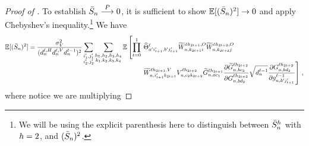 \begin{proof}[Proof of ]
    To establish $\bar{S}_{n} \overset{P}{\longrightarrow} 0$, it is sufficient to show $\operatorname*{\mathbb{E}} [ (\bar{S}_{n})^2 ] \to 0$ and apply Chebyshev's inequality.\footnote{We will be using the explicit parenthesis here to distinguish between $\bar{S}_{n}^h$ with $h = 2$, and $(\bar{S}_n)^2$.}
    We have
    \begin{align*}
        \operatorname*{\mathbb{E}} [(\bar{S}_{n})^2]
        =
        \frac{\sigma_{V}^2}{(d_{n}^{\ell, H} d_{n}^{\ell, V}d_{n}^{\ell - 1})^2}
        \sum_{\substack{i'_1, j'_1 \\ i'_2, j'_2}}
        \sum_{\substack{h_1, h_2, h_3, h_4 \\ k_1, k_2, k_3, k_4}}
            \begin{aligned}[t]
            \operatorname*{\mathbb{E}} \left[
                \prod_{t=0}^1
                \right.&\left.
                \widehat{\Theta}_{
                    a' i'_{t+1} , b' j'_{t+1}
                }^{\ell}
                \widetilde{W}_{n , k_{2t + 1} i}^{\ell h_{2t + 1} , O}
                \widetilde{W}_{n , k_{2t + 2} j}^{\ell h_{2t + 2} , O}
                \right.
                \\
                &\left.
                \widetilde{W}_{n, i'_{t+1} k_{2t + 1}}^{\ell h_{2t + 1}, V}
                V_{n, c_2 k_{2t + 2}}^{\ell h_{2t + 2}}
                \widetilde{G}_{n, a c_1}^{\ell h_{2t + 1}}
                \frac{
                    \partial
                    \widetilde{G}_{n, b c_2}^{\ell h_{2t + 2}}
                }{
                    \partial 
                    G_{n, b d_2}^{\ell h_{2t + 2}}
                }
                \sqrt{d_{n}^{\ell - 1}}
                \frac{
                    \partial 
                    G_{n, b d_2}^{\ell h_{2t + 2}}
                }{
                    \partial g_{n, b' j'_{t+1}}^{\ell - 1}
                }
        \right]
        \, ,
        \end{aligned}
    \end{align*}
    where notice we are multiplying

\end{proof}
